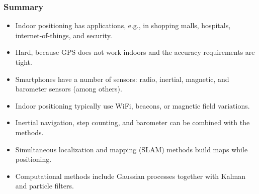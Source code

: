 \documentclass[xcolor=svgnames,english,handout]{beamer}
\begin{document}
\begin{frame}
  \frametitle{Summary}

  \begin{itemize}[<+->]       
  \item \alert{Indoor positioning} has applications, e.g., in shopping malls, hospitals, internet-of-things, and security.
  \item Hard, because \alert{GPS does not work} indoors and the \alert{accuracy requirements} are tight.
  \item Smartphones have a number of sensors: \alert{radio, inertial, magnetic, and barometer sensors} (among others).
  \item Indoor positioning typically use \alert{WiFi, beacons, or magnetic field variations}.
  \item \alert{Inertial navigation, step counting, and barometer} can be combined with the methods.
  \item \alert{Simultaneous localization and mapping (SLAM)} methods build maps while positioning.
  \item Computational methods include \alert{Gaussian processes} together with \alert{Kalman and particle filters}.
  \end{itemize}
\end{frame}
\end{document}
